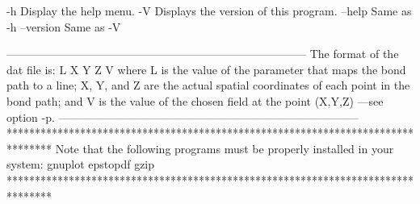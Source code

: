   -h     	Display the help menu.
  -V     	Displays the version of this program.
  --help    		Same as -h
  --version 		Same as -V

--------------------------------------------------------------------------------
            	The format of the dat file is:
            	      L  X  Y  Z  V
            	  where L is the value of the parameter that maps the bond
            	  path to a line; X, Y, and Z are the actual spatial coordinates
            	  of each point in the bond path; and V is the value of the
            	  chosen field at the point (X,Y,Z) ---see option -p.
--------------------------------------------------------------------------------
********************************************************************************
  Note that the following programs must be properly installed in your system:
                                    gnuplot
                                    epstopdf
                                      gzip
********************************************************************************
